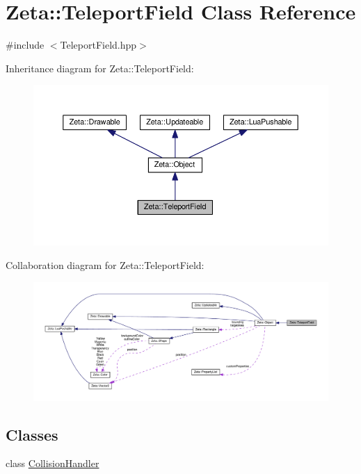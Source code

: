 \hypertarget{classZeta_1_1TeleportField}{\section{Zeta\+:\+:Teleport\+Field Class Reference}
\label{classZeta_1_1TeleportField}
}


{\ttfamily \#include $<$Teleport\+Field.\+hpp$>$}



Inheritance diagram for Zeta\+:\+:Teleport\+Field\+:\nopagebreak
\begin{figure}[H]
\begin{center}
\leavevmode
\includegraphics[width=350pt]{classZeta_1_1TeleportField__inherit__graph}
\end{center}
\end{figure}


Collaboration diagram for Zeta\+:\+:Teleport\+Field\+:\nopagebreak
\begin{figure}[H]
\begin{center}
\leavevmode
\includegraphics[width=350pt]{classZeta_1_1TeleportField__coll__graph}
\end{center}
\end{figure}
\subsection*{Classes}
\begin{DoxyCompactItemize}
\item 
class \hyperlink{classZeta_1_1TeleportField_1_1CollisionHandler}{Collision\+Handler}
\end{DoxyCompactItemize}

